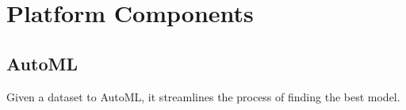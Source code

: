 \section{Platform Components}

\subsection{AutoML}
Given a dataset to AutoML, it streamlines the process of finding the best model.\\

